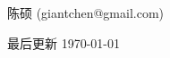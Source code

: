 \thispagestyle{plain}
\begin{center}
  {\LARGE\textbf{\BookTitle}}

  \vspace{1em}
  {\large 陈硕 (giantchen@gmail.com)}

  \vspace{1ex}
  最后更新 \today
\end{center}


